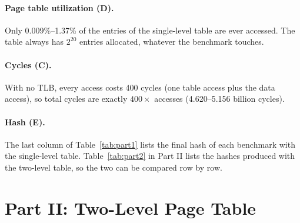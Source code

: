 \documentclass[11pt,a4paper]{article}
\begin{document}
\paragraph{Page table utilization (D).} Only 0.009\%--1.37\% of the entries of the single-level table are ever accessed. The table always has $2^{20}$ entries allocated, whatever the benchmark touches.

\paragraph{Cycles (C).} With no TLB, every access costs 400 cycles (one table access plus the data access), so total cycles are exactly $400 \times$ accesses (4.620--5.156 billion cycles).

\paragraph{Hash (E).} The last column of Table~\ref{tab:part1} lists the final hash of each benchmark with the single-level table. Table~\ref{tab:part2} in Part II lists the hashes produced with the two-level table, so the two can be compared row by row.

\section{Part II: Two-Level Page Table}
\end{document}
